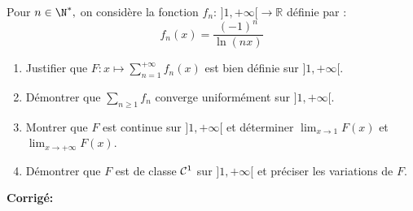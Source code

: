 \documentclass[a4paper,twoside,french,11pt]{VcCours}
\newcommand{\Sum}[2]{\sum_{#1}^{#2}}
\newcommand{\corr}{\textbf{Corrigé:}}
\begin{document}
\begin{Exercice}{} Pour $n\in\N^*,$ on considère la fonction $f_n : \, ] 1,+\infty[ \rightarrow \mathbb{R}$ définie par :
$$ f_n(x)=\frac{(-1)^n}{\ln(nx)}$$

\begin{enumerate}
	\item Justifier que $F : x\longmapsto \sum_{n=1}^{+\infty} f_n(x)$ est bien définie sur $]1,+\infty[.$
	
	\item Démontrer que $\Sum{n\geq 1}{} f_n$ converge uniformément sur $]1,+\infty[.$ 
	
	\item Montrer que $F$ est continue sur $]1,+\infty[$ et déterminer $\lim_{x \rightarrow 1}F(x)$ et  $\lim_{x \rightarrow  +\infty}F(x)$.
	
	\item Démontrer que $F$ est de classe ${\cal C}^1$ sur $]1,+\infty[$ et préciser les variations de $F.$
\end{enumerate}
\end{Exercice}

\corr  
\end{document}
